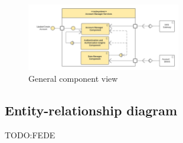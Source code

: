 \begin{figure}[h!]
    \centering
    \includegraphics[width=0.6\textwidth]{Images/AccountManagerServices.png}
    \caption{\label{fig:ComponentViewAccountManagerServices}{General component view}}
\end{figure}




\subsection{Entity-relationship diagram}
\label{subsect:entityrelationshipdiagram}

TODO:FEDE

